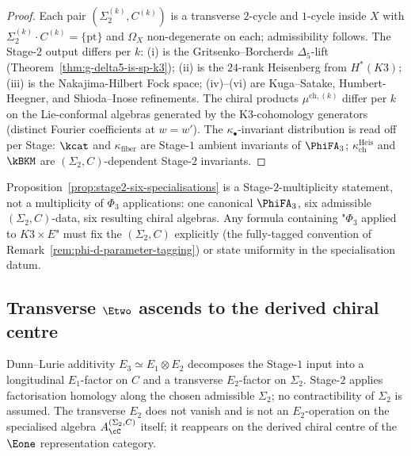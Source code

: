 \begin{proof}
Each pair $(\Sigma_2^{(k)},C^{(k)})$ is a transverse $2$-cycle and $1$-cycle inside $X$ with $\Sigma_2^{(k)}\cdot C^{(k)}=\{\mathrm{pt}\}$ and $\Omega_X$ non-degenerate on each; admissibility follows. The Stage-$2$ output differs per $k$: (i) is the Gritsenko--Borcherds $\Delta_5$-lift (Theorem~\ref{thm:g-delta5-is-sp-k3}); (ii) is the $24$-rank Heisenberg from $H^*(K3)$; (iii) is the Nakajima-Hilbert Fock space; (iv)--(vi) are Kuga--Satake, Humbert-Heegner, and Shioda--Inose refinements. The chiral products $\mu^{\mathrm{ch},(k)}$ differ per $k$ on the Lie-conformal algebras generated by the K3-cohomology generators (distinct Fourier coefficients at $w=w'$). The $\kappa_\bullet$-invariant distribution is read off per Stage: $\kcat$ and $\kappa_{\mathrm{fiber}}$ are Stage-$1$ ambient invariants of $\PhiFA_3$; $\kappa_{\mathrm{ch}}^{\mathrm{Heis}}$ and $\kBKM$ are $(\Sigma_2,C)$-dependent Stage-$2$ invariants.
\end{proof}

\begin{remark}
\label{rem:stage2-scope-declaration}
Proposition~\ref{prop:stage2-six-specialisations} is a Stage-$2$-multiplicity statement, not a multiplicity of $\Phi_3$ applications: one canonical $\PhiFA_3$, six admissible $(\Sigma_2,C)$-data, six resulting chiral algebras. Any formula containing "$\Phi_3$ applied to $K3\times E$" must fix the $(\Sigma_2,C)$ explicitly (the fully-tagged convention of Remark~\ref{rem:phi-d-parameter-tagging}) or state uniformity in the specialisation datum.
\end{remark}

\subsection{Transverse \texorpdfstring{$\Etwo$}{E-2} ascends to the derived chiral centre}
\label{subsec:stage2-e2-transverse}

Dunn--Lurie additivity $E_3\simeq E_1\otimes E_2$ decomposes the Stage-$1$ input into a longitudinal $E_1$-factor on $C$ and a transverse $E_2$-factor on $\Sigma_2$. Stage-$2$ applies factorisation homology along the chosen admissible $\Sigma_2$; no contractibility of $\Sigma_2$ is assumed. The transverse $E_2$ does not vanish and is not an $E_2$-operation on the specialised algebra $A_\cC^{(\Sigma_2,C)}$ itself; it reappears on the derived chiral centre of the $\Eone$ representation category.

